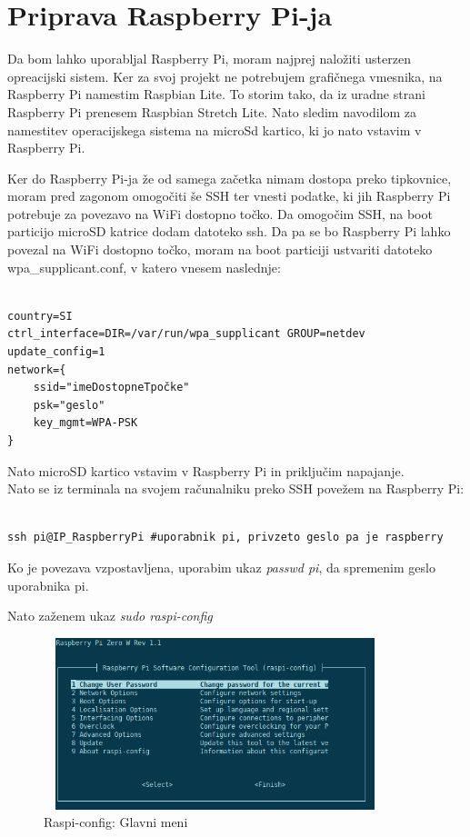 \documentclass[11pt]{article}
\begin{document}
\section{Priprava Raspberry Pi-ja}
 Da bom lahko uporabljal Raspberry Pi, moram najprej naložiti usterzen opreacijski sistem. Ker za svoj projekt ne potrebujem grafičnega vmesnika, na Raspberry Pi namestim Raspbian Lite. To storim tako, da iz uradne strani Raspberry Pi \cite{RPi_raspbian} prenesem Raspbian Stretch Lite. Nato sledim navodilom za namestitev \cite{RPi_install} operacijskega sistema na microSd kartico, ki jo nato vstavim v Raspberry Pi.

Ker do Raspberry Pi-ja že od samega začetka nimam dostopa preko tipkovnice, moram pred zagonom omogočiti še SSH ter vnesti podatke, ki jih Raspberry Pi potrebuje za povezavo na WiFi dostopno točko. Da omogočim SSH, na boot particijo microSD katrice dodam datoteko ssh. Da pa se bo Raspberry Pi lahko povezal na WiFi dostopno točko, moram na boot particiji ustvariti datoteko wpa\_supplicant.conf, v katero vnesem naslednje:

\begin{verbatim}

country=SI
ctrl_interface=DIR=/var/run/wpa_supplicant GROUP=netdev
update_config=1
network={
	ssid="imeDostopneTpočke"
	psk="geslo"
	key_mgmt=WPA-PSK
}
\end{verbatim}

Nato microSD kartico vstavim v Raspberry Pi in priključim napajanje.
\\

Nato se iz terminala na svojem računalniku preko SSH povežem na Raspberry Pi:

\begin{verbatim}

ssh pi@IP_RaspberryPi #uporabnik pi, privzeto geslo pa je raspberry
\end{verbatim}

Ko je povezava vzpostavljena, uporabim ukaz \textit{passwd pi}, da spremenim geslo uporabnika pi.

Nato zaženem ukaz \textit{sudo raspi-config}
\begin{figure}[h]
\centering
\includegraphics[width=10cm, height=5cm]{images/raspi-config.png}
\caption{Raspi-config: Glavni meni}
\end{figure}
\end{document}
